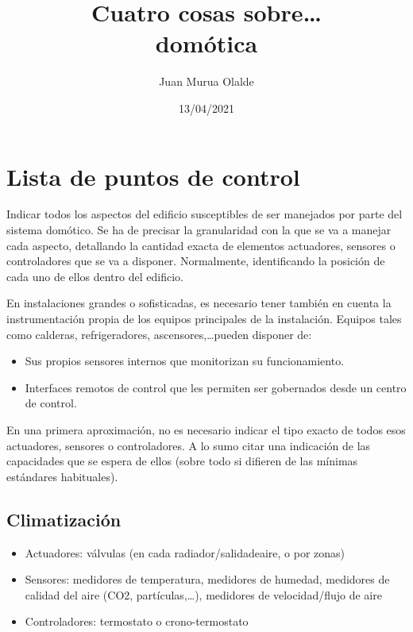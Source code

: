 \documentclass[spanish,10pt,a4paper,final,oneside]{article}
\title{Cuatro cosas sobre\ldots \\ \vspace{0.3cm}domótica}
\author{Juan Murua Olalde}
\date{13/04/2021}
\begin{document}
\begin{center}\begin{LARGE}
\MyTitle
\end{LARGE}\end{center}
\begin{footnotesize}
\end{footnotesize}

\hypersetup{linkcolor=black}



\section{Lista de puntos de control}
Indicar todos los aspectos del edificio susceptibles de ser manejados por parte del sistema domótico. Se ha de precisar la granularidad con la que se va a manejar cada aspecto, detallando la cantidad exacta de elementos actuadores, sensores o controladores que se va a disponer. Normalmente, identificando la posición de cada uno de ellos dentro del edificio.  

En instalaciones grandes o sofisticadas, es necesario tener también en cuenta la instrumentación propia de los equipos principales de la instalación. Equipos tales como calderas, refrigeradores, ascensores,\ldots pueden disponer de:
\begin{itemize}
\item Sus propios sensores internos que monitorizan su funcionamiento.
\item Interfaces remotos de control que les permiten ser gobernados desde un centro de control. 
\end{itemize}

En una primera aproximación, no es necesario indicar el tipo exacto de todos esos actuadores, sensores o controladores. A lo sumo citar una indicación de las capacidades que se espera de ellos (sobre todo si difieren de las mínimas estándares habituales). 


\subsection{Climatización}
\begin{itemize}
\item Actuadores: válvulas (en cada radiador/salidadeaire, o por zonas)
\item Sensores: medidores de temperatura, medidores de humedad,  medidores de calidad del aire (CO2, partículas,\ldots), medidores de velocidad/flujo de aire  
\item Controladores: termostato o crono-termostato
\end{itemize}
\end{document}
